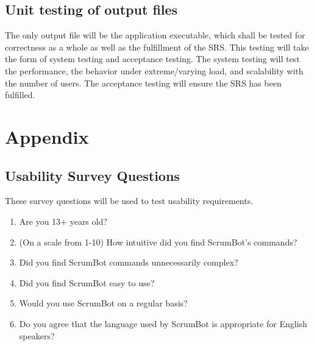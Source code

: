 \documentclass[12pt, titlepage]{article}
\begin{document}
\subsection{Unit testing of output files}		
The only output file will be the application executable, which shall be tested for correctness as a whole as well as the fulfillment of the SRS. This testing will take the form of system testing and acceptance testing. The system testing will test the performance, the behavior under extreme/varying load, and scalability with the number of users. The acceptance testing will ensure the SRS has been fulfilled.



\newpage

\section{Appendix}


\subsection{Usability Survey Questions}
These survey questions will be used to test usability requirements.
\begin{enumerate}
    \item Are you 13+ years old?
    \item (On a scale from 1-10) How intuitive did you find ScrumBot's commands?
    \item Did you find ScrumBot commands unnecessarily complex?
    \item Did you find ScrumBot easy to use?
    \item Would you use ScrumBot on a regular basis?
    \item Do you agree that the language used by ScrumBot is appropriate for English speakers?
\end{enumerate}
\end{document}
